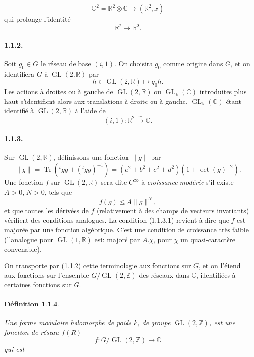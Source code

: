\documentclass[10pt,a4paper]{article}
\providecommand{\GL}{\operatorname{GL}}
\providecommand{\Tr}{\operatorname{Tr}}
\providecommand{\R}{\mathbb R}
\providecommand{\Z}{\mathbb Z}
\providecommand{\C}{\mathbb C}
\providecommand{\iso}{\xrightarrow{\sim}}
\begin{document}
\clearpage
{}
\hypertarget{authority-10}{}
\[
\C^2=\R^2\otimes\C\longrightarrow (\R^2,x)
\]
qui prolonge l'identité
\[
\R^2\longrightarrow\R^2.
\]

\paragraph{1.1.2.} Soit $g_0\in G$ le réseau de base $(i,1)$. On choisira $g_0$ comme origine dans $G$, et on identifiera $G$ à $\GL(2,\R)$ par
\[
h\in\GL(2,\R)\longmapsto g_0h.
\]
Les actions à droites ou à gauche de $\GL(2,\R)$ ou $\GL_{\R}(\C)$ introduites plus haut s'identifient alors aux translations à droite ou à gauche, $\GL_{\R}(\C)$ étant identifié à $\GL(2,\R)$ à l'aide de
\[
(i,1):\R^2\iso\C.
\]

\paragraph{1.1.3.} Sur $\GL(2,\R)$, définissons une fonction $\|g\|$ par
\[
\|g\|=\Tr({}^{t}gg+({}^{t}gg)^{-1})
=(a^2+b^2+c^2+d^2)(1+\det(g)^{-2}).
\]
Une fonction $f$ sur $\GL(2,\R)$ sera dite $C^\infty$ à \emph{croissance modérée} s'il existe $A>0$, $N>0$, tels que
\[
\tag{1.1.3.1}
f(g)\le A\|g\|^N,
\]
et que toutes les dérivées de $f$ (relativement à des champs de vecteurs invariants) vérifient des conditions analogues. La condition (1.1.3.1) revient à dire que $f$ est majorée par une fonction algébrique. C'est une condition de croissance très faible (l'analogue pour $\GL(1,\R)$ est: majoré par $A.\chi$, pour $\chi$ un quasi-caractère convenable).

On transporte par (1.1.2) cette terminologie aux fonctions sur $G$, et on l'étend aux fonctions sur l'ensemble $G/\GL(2,\Z)$ des réseaux dans $\C$, identifiées à certaines fonctions sur $G$.

\paragraph{Définition 1.1.4.}{\itshape  Une forme modulaire holomorphe de poids $k$, de groupe $\GL(2,\Z)$, est une fonction de réseau $f(R)$
\[
f:G/\GL(2,\Z)\longrightarrow\C
\]
qui est\par}
\end{document}
